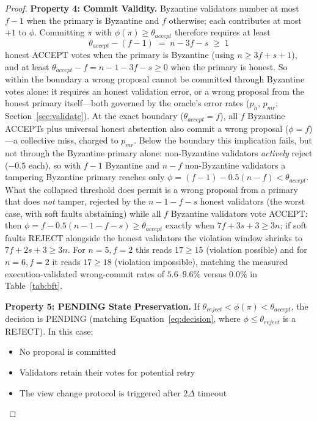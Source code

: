 \documentclass{article}
\begin{document}
\begin{proof}
\textbf{Property 4: Commit Validity.}
Byzantine validators number at most $f-1$ when the primary is Byzantine and $f$ otherwise; each contributes at most $+1$ to $\phi$. Committing $\pi$ with $\phi(\pi) \geq \theta_{accept}$ therefore requires at least
\begin{equation}
    \theta_{accept} - (f-1) \;=\; n - 3f - s \;\geq\; 1
\end{equation}
honest ACCEPT votes when the primary is Byzantine (using $n \geq 3f+s+1$), and at least $\theta_{accept} - f = n-1-3f-s \geq 0$ when the primary is honest. So within the boundary a wrong proposal cannot be committed through Byzantine votes alone: it requires an honest validation error, or a wrong proposal from the honest primary itself---both governed by the oracle's error rates ($p_h$, $p_{\mathit{mr}}$; Section~\ref{sec:validate}). At the exact boundary ($\theta_{accept} = f$), all $f$ Byzantine ACCEPTs plus universal honest abstention also commit a wrong proposal ($\phi = f$)---a collective miss, charged to $p_{\mathit{mr}}$. Below the boundary this implication fails, but not through the Byzantine primary alone: non-Byzantine validators \emph{actively} reject ($-0.5$ each), so with $f{-}1$ Byzantine and $n{-}f$ non-Byzantine validators a tampering Byzantine primary reaches only $\phi = (f{-}1) - 0.5(n{-}f) < \theta_{accept}$. What the collapsed threshold does permit is a wrong proposal from a primary that does \emph{not} tamper, rejected by the $n{-}1{-}f{-}s$ honest validators (the worst case, with soft faults abstaining) while all $f$ Byzantine validators vote ACCEPT: then $\phi = f - 0.5(n{-}1{-}f{-}s) \geq \theta_{accept}$ exactly when $7f + 3s + 3 \geq 3n$; if soft faults REJECT alongside the honest validators the violation window shrinks to $7f + 2s + 3 \geq 3n$. For $n{=}5, f{=}2$ this reads $17 \geq 15$ (violation possible) and for $n{=}6, f{=}2$ it reads $17 \geq 18$ (violation impossible), matching the measured execution-validated wrong-commit rates of $5.6$--$9.6\%$ versus $0.0\%$ in Table~\ref{tab:bft}.

\textbf{Property 5: PENDING State Preservation.}
If $\theta_{reject} < \phi(\pi) < \theta_{accept}$, the decision is PENDING (matching Equation~\ref{eq:decision}, where $\phi \leq \theta_{reject}$ is a REJECT). In this case:
\begin{itemize}
    \item No proposal is committed
    \item Validators retain their votes for potential retry
    \item The view change protocol is triggered after $2\Delta$ timeout
\end{itemize}


\end{proof}
\end{document}
